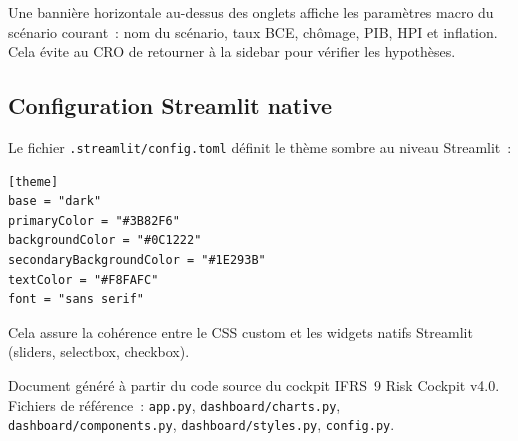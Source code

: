\documentclass[12pt,a4paper]{article}
\begin{document}
Une banni\`ere horizontale au-dessus des onglets affiche les param\`etres macro du sc\'enario courant~: nom du sc\'enario, taux BCE, ch\^omage, PIB, HPI et inflation. Cela \'evite au CRO de retourner \`a la sidebar pour v\'erifier les hypoth\`eses.

\subsection{Configuration Streamlit native}

Le fichier \texttt{.streamlit/config.toml} d\'efinit le th\`eme sombre au niveau Streamlit~:
\begin{lstlisting}
[theme]
base = "dark"
primaryColor = "#3B82F6"
backgroundColor = "#0C1222"
secondaryBackgroundColor = "#1E293B"
textColor = "#F8FAFC"
font = "sans serif"
\end{lstlisting}

Cela assure la coh\'erence entre le CSS custom et les widgets natifs Streamlit (sliders, selectbox, checkbox).


\vfill
\begin{center}
\small\color{gray}
Document g\'en\'er\'e \`a partir du code source du cockpit IFRS~9 Risk Cockpit v4.0.\\
Fichiers de r\'ef\'erence~: \texttt{app.py}, \texttt{dashboard/charts.py}, \texttt{dashboard/components.py}, \texttt{dashboard/styles.py}, \texttt{config.py}.
\end{center}
\end{document}
